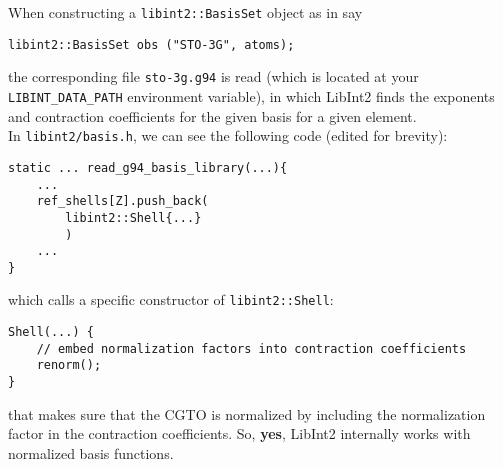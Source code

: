 \documentclass[12pt]{article}
\begin{document}
    When constructing a \lstinline{libint2::BasisSet} object as in say

\begin{lstlisting}
libint2::BasisSet obs ("STO-3G", atoms);
\end{lstlisting}

    the corresponding file \lstinline{sto-3g.g94} is read (which is located at your \lstinline{LIBINT_DATA_PATH} environment variable), in which LibInt2 finds the exponents and contraction coefficients for the given basis for a given element. \\

    In \lstinline{libint2/basis.h}, we can see the following code (edited for brevity):

\begin{lstlisting}
static ... read_g94_basis_library(...){
    ...
    ref_shells[Z].push_back(
        libint2::Shell{...}
        )
    ...
}
\end{lstlisting}

    which calls a specific constructor of \lstinline{libint2::Shell}:

\begin{lstlisting}
Shell(...) {
    // embed normalization factors into contraction coefficients
    renorm();
}
\end{lstlisting}

    that makes sure that the CGTO is normalized by including the normalization factor in the contraction coefficients. So, \textbf{yes}, LibInt2 internally works with normalized basis functions.




\newpage


\end{document}
